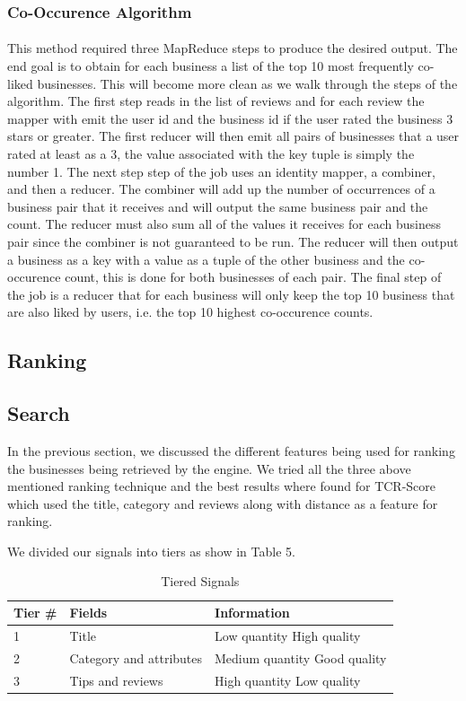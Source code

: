 \documentclass[paper=letter, fontsize=15pt]{article} %
\begin{document}
\subsubsection{Co-Occurence Algorithm}
\paragraph{}This method required three MapReduce steps to produce the desired output. The end goal is to obtain for each business a list of the top 10 most frequently co-liked businesses. This will become more clean as we walk through the steps of the algorithm. The first step reads in the list of reviews and for each review the mapper with emit the user id and the business id if the user rated the business 3 stars or greater. The first reducer will then emit all pairs of businesses that a user rated at least as a 3, the value associated with the key tuple is simply the number 1. The next step step of the job uses an identity mapper, a combiner, and then a reducer. The combiner will add up the number of occurrences of a business pair that it receives and will output the same business pair and the count. The reducer must also sum all of the values it receives for each business pair since the combiner is not guaranteed to be run. The reducer will then output a business as a key with a value as a tuple of the other business and the co-occurence count, this is done for both businesses of each pair. The final step of the job is a reducer that for each business will only keep the top 10 business that are also liked by users, i.e. the top 10 highest co-occurence counts. 

\subsection{Ranking}
\subsection{Search}
In the previous section, we discussed the different features being used for ranking the businesses being retrieved by the engine. We tried all the three above mentioned ranking technique and the best results where found for TCR-Score which used the title, category and reviews along with distance as a feature for ranking.

We divided our signals into tiers as show in Table 5.
\begin{table}[h!]
\centering
\begin{tabular}{|l|l|l|}
\hline
\textbf{Tier \#} & \textbf{Fields} & \textbf{Information} \\ \hline
1 & Title & Low quantity High quality \\ \hline
2 & Category and attributes & Medium quantity Good quality \\ \hline
3 & Tips and reviews & High quantity Low quality \\ \hline

\end{tabular}
\caption{Tiered Signals}
\end{table}
\end{document}
